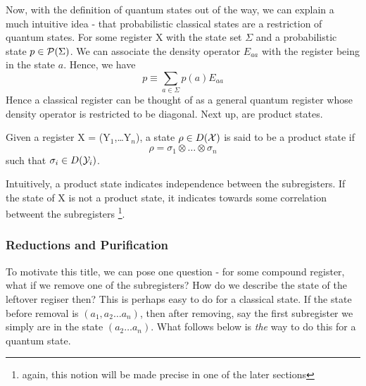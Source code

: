 \noindent Now, with the definition of quantum states out of the way, we can explain a much intuitive idea - that probabilistic classical states are a restriction of quantum states. For some register \textsf{X} with the state set $\Sigma$ and a probabilistic state $p \in \P(\Sigma)$. We can associate the density operator $E_{aa}$ with the register being in the state $a$. Hence, we have
\[p \equiv \sum_{a\in\Sigma}p(a)E_{aa}\]
Hence a classical register can be thought of as a general quantum register whose density operator is restricted to be diagonal. Next up, are product states.
\begin{definition}
Given a register \textsf{X} = (\textsf{Y}$_1$,\dots \textsf{Y}$_n$), a state $\rho\in D(\X)$ is said to be a product state if 
\[\rho = \sigma_1\otimes\dots\otimes\sigma_n\]
such that $\sigma_i\in D(\Y_i)$.
\end{definition}
Intuitively, a product state indicates independence between the subregisters. If the state of \textsf{X} is not a product state, it indicates towards some correlation betweent the subregisters \footnote{again, this notion will be made precise in one of the later sections}.

\subsubsection{Reductions and Purification}
To motivate this title, we can pose one question - for some compound register, what if we remove one of the subregisters? How do we describe the state of the leftover regiser then? This is perhaps easy to do for a classical state. If the state before removal is $(a_1,a_2\dots a_n)$, then after removing, say the first subregister we simply are in the state $(a_2\dots a_n)$. What follows below is \textit{the} way to do this for a quantum state.


